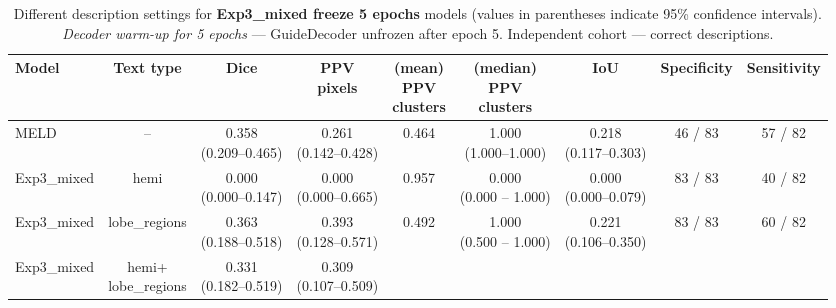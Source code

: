 \documentclass[a4paper,12pt]{article}
\begin{document}
\begin{table}[ht]
\centering
\tiny
\caption{Different description settings for \textbf{Exp3\_mixed freeze 5 epochs} models (values in parentheses indicate 95\% confidence intervals). \emph{Decoder warm-up for 5 epochs} — GuideDecoder unfrozen after epoch 5. Independent cohort — correct descriptions.}

\label{tab:main_cohort_mixed}
\begin{tabular}{lcccccccc}
\textbf{Model} &
\textbf{Text type} &
\textbf{Dice} &
\makecell{\textbf{PPV}\\\textbf{pixels}} &
\makecell{\textbf{(mean)} \\\textbf{PPV} \\\textbf{clusters}} & \makecell{\textbf{(median)} \\\textbf{PPV} \\\textbf{clusters}} & 
\textbf{IoU} & 
\textbf{Specificity} &
\textbf{Sensitivity} \\
\hline
MELD & -- &
\makecell{\colorbox{blue!20}{0.358}\\(0.209--0.465)} &
\makecell{0.261\\(0.142--0.428)} &
0.464 &
\makecell{1.000\\(1.000--1.000)} &
\makecell{\colorbox{blue!20}{0.218}\\(0.117--0.303)} &
46 / 83 & 
57 / 82 \\
\hline
Exp3\_mixed & 
hemi &
\makecell{0.000 \\ (0.000--0.147)} &
\makecell{0.000 \\ (0.000--0.665)} &
\colorbox{green!20}{0.957} &
\makecell{0.000 \\ (0.000 -- 1.000)}&
\makecell{0.000 \\ (0.000--0.079)} &
83 / 83 &
40 / 82 \\
\hline
Exp3\_mixed & 
lobe\_regions &
\makecell{\colorbox{green!20}{0.363} \\ (0.188--0.518)} &
\makecell{\colorbox{green!20}{0.393} \\ (0.128--0.571)} &
\colorbox{orange!20}{0.492} &
\makecell{1.000 \\ (0.500 -- 1.000)}&
\makecell{\colorbox{green!20}{0.221} \\ (0.106--0.350)} &
83 / 83&
\colorbox{orange!20}{60 / 82} \\
\hline
Exp3\_mixed & 
\makecell{hemi+ \\lobe\_regions} &
\makecell{0.331 \\ (0.182--0.519)} &
\makecell{0.309 \\ (0.107--0.509)} &

\end{tabular}
\end{table}
\end{document}
